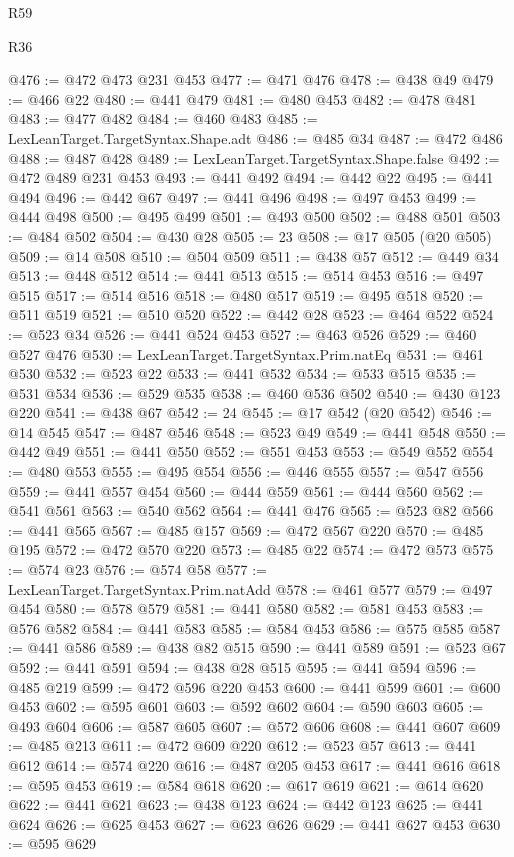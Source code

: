 \begin{lexlean}{R59}
\begin{lexlean}{R36}
\begin{coremodule}
{{{{{{{{{{{{{{{{{{{{{{{{{{{{{{{{{{{{{{{{{{{{{{{{{{{{{{{{{{{{{{{{{{{{{{{{{{{{{{{{{{@476 := @472 @473 @231 @453
@477 := @471 @476
@478 := @438 @49
@479 := @466 @22
@480 := @441 @479
@481 := @480 @453
@482 := @478 @481
@483 := @477 @482
@484 := @460 @483
@485 := LexLeanTarget.TargetSyntax.Shape.adt
@486 := @485 @34
@487 := @472 @486
@488 := @487 @428
@489 := LexLeanTarget.TargetSyntax.Shape.false
@492 := @472 @489 @231 @453
@493 := @441 @492
@494 := @442 @22
@495 := @441 @494
@496 := @442 @67
@497 := @441 @496
@498 := @497 @453
@499 := @444 @498
@500 := @495 @499
@501 := @493 @500
@502 := @488 @501
@503 := @484 @502
@504 := @430 @28
@505 := 23
@508 := @17 @505 (@20 @505)
@509 := @14 @508
@510 := @504 @509
@511 := @438 @57
@512 := @449 @34
@513 := @448 @512
@514 := @441 @513
@515 := @514 @453
@516 := @497 @515
@517 := @514 @516
@518 := @480 @517
@519 := @495 @518
@520 := @511 @519
@521 := @510 @520
@522 := @442 @28
@523 := @464 @522
@524 := @523 @34
@526 := @441 @524 @453
@527 := @463 @526
@529 := @460 @527 @476
@530 := LexLeanTarget.TargetSyntax.Prim.natEq
@531 := @461 @530
@532 := @523 @22
@533 := @441 @532
@534 := @533 @515
@535 := @531 @534
@536 := @529 @535
@538 := @460 @536 @502
@540 := @430 @123 @220
@541 := @438 @67
@542 := 24
@545 := @17 @542 (@20 @542)
@546 := @14 @545
@547 := @487 @546
@548 := @523 @49
@549 := @441 @548
@550 := @442 @49
@551 := @441 @550
@552 := @551 @453
@553 := @549 @552
@554 := @480 @553
@555 := @495 @554
@556 := @446 @555
@557 := @547 @556
@559 := @441 @557 @454
@560 := @444 @559
@561 := @444 @560
@562 := @541 @561
@563 := @540 @562
@564 := @441 @476
@565 := @523 @82
@566 := @441 @565
@567 := @485 @157
@569 := @472 @567 @220
@570 := @485 @195
@572 := @472 @570 @220
@573 := @485 @22
@574 := @472 @573
@575 := @574 @23
@576 := @574 @58
@577 := LexLeanTarget.TargetSyntax.Prim.natAdd
@578 := @461 @577
@579 := @497 @454
@580 := @578 @579
@581 := @441 @580
@582 := @581 @453
@583 := @576 @582
@584 := @441 @583
@585 := @584 @453
@586 := @575 @585
@587 := @441 @586
@589 := @438 @82 @515
@590 := @441 @589
@591 := @523 @67
@592 := @441 @591
@594 := @438 @28 @515
@595 := @441 @594
@596 := @485 @219
@599 := @472 @596 @220 @453
@600 := @441 @599
@601 := @600 @453
@602 := @595 @601
@603 := @592 @602
@604 := @590 @603
@605 := @493 @604
@606 := @587 @605
@607 := @572 @606
@608 := @441 @607
@609 := @485 @213
@611 := @472 @609 @220
@612 := @523 @57
@613 := @441 @612
@614 := @574 @220
@616 := @487 @205 @453
@617 := @441 @616
@618 := @595 @453
@619 := @584 @618
@620 := @617 @619
@621 := @614 @620
@622 := @441 @621
@623 := @438 @123
@624 := @442 @123
@625 := @441 @624
@626 := @625 @453
@627 := @623 @626
@629 := @441 @627 @453
@630 := @595 @629
}}}}}}}}}}}}}}}}}}}}}}}}}}}}}}}}}}}}}}}}}}}}}}}}}}}}}}}}}}}}}}}}}}}}}}}}}}}}}}}}}}
\end{coremodule}
\end{lexlean}
\end{lexlean}
